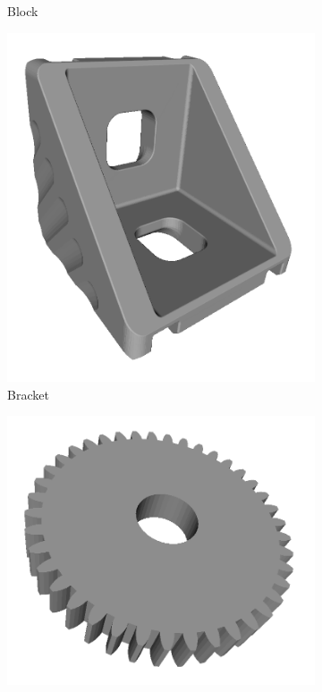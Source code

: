 \begin{figure}[t]
\begin{subfigure}[b]{0.16\linewidth}
		\caption{Block}
	\end{subfigure}
	\begin{subfigure}[b]{0.16\linewidth} \centering
		\includegraphics[width=1\linewidth]{./fig/eval/toshiba_bracket1.png}
		\caption{Bracket}
	\end{subfigure}
	\begin{subfigure}[b]{0.16\linewidth} \centering
		\includegraphics[width=1\linewidth]{./fig/eval/toshiba_cog1.png}

\end{subfigure}
\end{figure}
